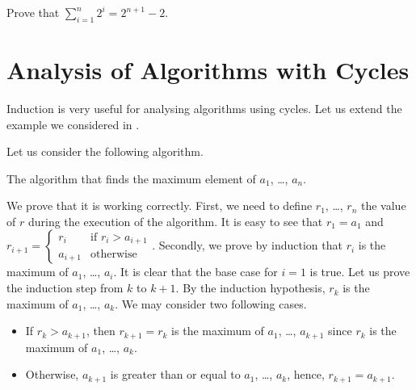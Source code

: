 \begin{exercise}
  Prove that $\sum_{i = 1}^n 2^i = 2^{n + 1} - 2$.
\end{exercise}

\section{Analysis of Algorithms with Cycles}

Induction is very useful for analysing algorithms using cycles. Let us extend
the example we considered in .

Let us consider the following algorithm.
\begin{algorithm}
  \begin{algorithmic}[1]
        \EndIf
      \EndFor
      \State{}
    \EndFunction
  \end{algorithmic}
  \caption{The algorithm that finds the maximum element of $a_1$, \dots, $a_n$.}
\end{algorithm}
We prove that it is working correctly. First, we need to define $r_1$,
\dots, $r_n$ the value of $r$ during the execution of the algorithm.
It is easy to see that $r_1 = a_1$ and
$
  r_{i + 1} =
  \begin{cases}
    r_i & \text{if } r_i > a_{i + 1} \\
    a_{i + 1} & \text{otherwise}
  \end{cases}
$.
Secondly, we prove by induction that $r_i$ is the maximum of $a_1$, \dots,
$a_i$. It is clear that the base case for $i = 1$ is true. Let us prove the
induction step from $k$ to $k + 1$. By the induction hypothesis, $r_k$
is the maximum of $a_1$, \dots, $a_k$. We may consider two following cases.
\begin{itemize}
  \item If $r_k > a_{k + 1}$, then $r_{k + 1} = r_{k}$ is the maximum of $a_1$,
    \dots, $a_{k + 1}$ since $r_k$ is the maximum of $a_1$, \dots, $a_k$.
  \item Otherwise, $a_{k + 1}$ is greater than or equal to $a_1$, \dots, $a_k$, hence,
    $r_{k + 1} = a_{k + 1}$.
\end{itemize}

